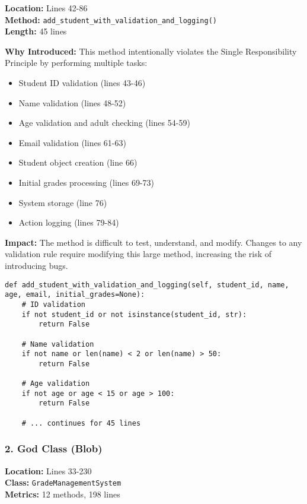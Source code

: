 \documentclass[11pt,a4paper]{article}
\begin{document}
\textbf{Location:} Lines 42-86 \\
\textbf{Method:} \texttt{add\_student\_with\_validation\_and\_logging()} \\
\textbf{Length:} 45 lines

\textbf{Why Introduced:} This method intentionally violates the Single Responsibility Principle by performing multiple tasks:

\begin{itemize}[noitemsep]
    \item Student ID validation (lines 43-46)
    \item Name validation (lines 48-52)
    \item Age validation and adult checking (lines 54-59)
    \item Email validation (lines 61-63)
    \item Student object creation (line 66)
    \item Initial grades processing (lines 69-73)
    \item System storage (line 76)
    \item Action logging (lines 79-84)
\end{itemize}

\textbf{Impact:} The method is difficult to test, understand, and modify. Changes to any validation rule require modifying this large method, increasing the risk of introducing bugs.

\begin{lstlisting}[caption={Long Method Example - Multiple Responsibilities}]
def add_student_with_validation_and_logging(self, student_id, name, age, email, initial_grades=None):
    # ID validation
    if not student_id or not isinstance(student_id, str):
        return False
    
    # Name validation  
    if not name or len(name) < 2 or len(name) > 50:
        return False
    
    # Age validation
    if not age or age < 15 or age > 100:
        return False
    
    # ... continues for 45 lines
\end{lstlisting}

\subsubsection{2. God Class (Blob)}

\textbf{Location:} Lines 33-230 \\
\textbf{Class:} \texttt{GradeManagementSystem} \\
\textbf{Metrics:} 12 methods, 198 lines
\end{document}
